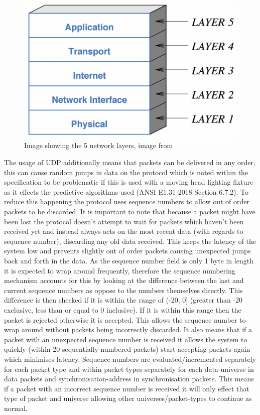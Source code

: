 \documentclass[11pt,a4paper]{article}
\begin{document}
\begin{figure}[H]
	\includegraphics[width=\textwidth]{net_stack}
	\caption{Image showing the 5 network layers, image from \cite{NET_STACK_IMAGE}}
	\label{NET_STACK}
\end{figure}

The usage of UDP additionally means that packets can be delivered in any order, this can cause random jumps in data on the protocol which is noted within the specification to be problematic if this is used with a moving head lighting fixture as it effects the predictive algorithms used (ANSI E1.31-2018 Section 6.7.2). To reduce this happening the protocol uses sequence numbers to allow out of order packets to be discarded. It is important to note that because a packet might have been lost the protocol doesn't attempt to wait for packets which haven't been received yet and instead always acts on the most recent data (with regards to sequence number), discarding any old data received. This keeps the latency of the system low and prevents slightly out of order packets causing unexpected jumps back and forth in the data. As the sequence number field is only 1 byte in length it is expected to wrap around frequently, therefore the sequence numbering mechanism accounts for this by looking at the difference between the last and current sequence numbers as oppose to the numbers themselves directly. This difference is then checked if it is within the range of (-20, 0] (greater than -20 exclusive, less than or equal to 0 inclusive). If it is within this range then the packet is rejected otherwise it is accepted. This allows the sequence number to wrap around without packets being incorrectly discarded. It also means that if a packet with an unexpected sequence number is received it allows the system to quickly (within 20 sequentially numbered packets) start accepting packets again which minimises latency. Sequence numbers are evaluated/incremented separately for each packet type and within packet types separately for each data-universe in data packets and synchronisation-address in synchronisation packets. This means if a packet with an incorrect sequence number is received it will only effect that type of packet and universe allowing other universes/packet-types to continue as normal.\\
\end{document}
